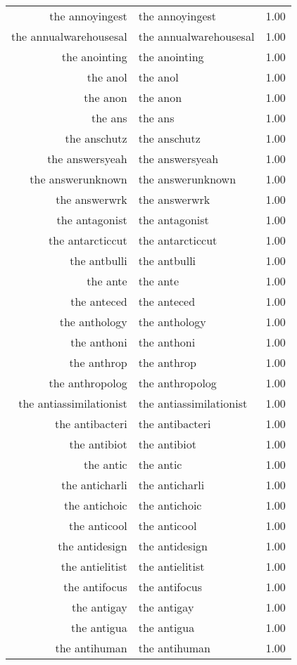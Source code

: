 \begin{table}[ht]
\begin{tabular}{rlr}
  the annoyingest & the annoyingest & 1.00 \\ 
  the annualwarehousesal & the annualwarehousesal & 1.00 \\ 
  the anointing & the anointing & 1.00 \\ 
  the anol & the anol & 1.00 \\ 
  the anon & the anon & 1.00 \\ 
  the ans & the ans & 1.00 \\ 
  the anschutz & the anschutz & 1.00 \\ 
  the answersyeah & the answersyeah & 1.00 \\ 
  the answerunknown & the answerunknown & 1.00 \\ 
  the answerwrk & the answerwrk & 1.00 \\ 
  the antagonist & the antagonist & 1.00 \\ 
  the antarcticcut & the antarcticcut & 1.00 \\ 
  the antbulli & the antbulli & 1.00 \\ 
  the ante & the ante & 1.00 \\ 
  the anteced & the anteced & 1.00 \\ 
  the anthology & the anthology & 1.00 \\ 
  the anthoni & the anthoni & 1.00 \\ 
  the anthrop & the anthrop & 1.00 \\ 
  the anthropolog & the anthropolog & 1.00 \\ 
  the antiassimilationist & the antiassimilationist & 1.00 \\ 
  the antibacteri & the antibacteri & 1.00 \\ 
  the antibiot & the antibiot & 1.00 \\ 
  the antic & the antic & 1.00 \\ 
  the anticharli & the anticharli & 1.00 \\ 
  the antichoic & the antichoic & 1.00 \\ 
  the anticool & the anticool & 1.00 \\ 
  the antidesign & the antidesign & 1.00 \\ 
  the antielitist & the antielitist & 1.00 \\ 
  the antifocus & the antifocus & 1.00 \\ 
  the antigay & the antigay & 1.00 \\ 
  the antigua & the antigua & 1.00 \\ 
  the antihuman & the antihuman & 1.00 \\ 

\end{tabular}
\end{table}
